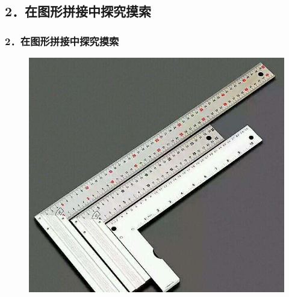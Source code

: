 \documentclass[aspectratio=169]{beamer}
\begin{document}
\subsection{2．在图形拼接中探究摸索}
     \begin{frame}
     \frametitle{2．在图形拼接中探究摸索}
     \begin{figure}
     	\centering
     	\includegraphics[scale=0.3]{角尺.jpg}
     \end{figure}
     \end{frame}
\end{document}
